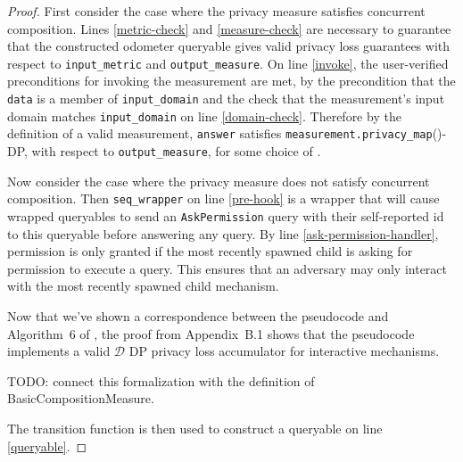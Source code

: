 \documentclass{article}
\begin{document}
\begin{proof}
    First consider the case where the privacy measure satisfies concurrent composition.
    Lines \ref{metric-check} and \ref{measure-check} are necessary to guarantee that the constructed odometer queryable 
    gives valid privacy loss guarantees with respect to \texttt{input\_metric} and \texttt{output\_measure}.
    On line \ref{invoke}, the user-verified preconditions for invoking the measurement are met,
    by the precondition that the \texttt{data} is a member of \texttt{input\_domain}
    and the check that the measurement's input domain matches \texttt{input\_domain} on line \ref{domain-check}.
    Therefore by the definition of a valid measurement,
    \texttt{answer} satisfies \texttt{measurement.privacy\_map}(\din)-DP, with respect to \texttt{output\_measure}, 
    for some choice of \din.

    Now consider the case where the privacy measure does not satisfy concurrent composition.
    Then \texttt{seq\_wrapper} on line \ref{pre-hook} is a wrapper that will cause wrapped queryables 
    to send an \texttt{AskPermission} query with their self-reported id to this queryable before answering any query.
    By line \ref{ask-permission-handler}, permission is only granted 
    if the most recently spawned child is asking for permission to execute a query.
    This ensures that an adversary may only interact with the most recently spawned child mechanism.
    
    
    Now that we've shown a correspondence between the pseudocode and Algorithm~6 of \cite{haney2023concurrentcompositioninteractivedifferential},
    the proof from Appendix~B.1 shows that the pseudocode implements a valid $\mathcal{D}$ DP privacy loss accumulator for interactive mechanisms.

    TODO: connect this formalization with the definition of BasicCompositionMeasure.

    The transition function is then used to construct a queryable on line \ref{queryable}.
\end{proof}



\end{document}

